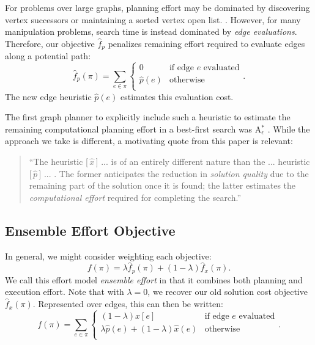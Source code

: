 For problems over large graphs,
planning effort may be dominated by discovering vertex successors
or maintaining a sorted vertex open list.
.
However, for many manipulation problems,
search time is instead dominated by \emph{edge evaluations}.
Therefore, our objective $\hat{f}_p$
penalizes remaining effort required to evaluate edges
along a potential path:
\begin{equation}
   \hat{f}_p(\pi) = \sum_{e \in \pi} \left\{
   \begin{array}{cl}
      0 & \mbox{if edge } e \mbox{ evaluated}  \\
      \hat{p}(e) & \mbox{otherwise} \\
   \end{array}
   \right.
   .
\end{equation}
The new edge heuristic $\hat{p}(e)$ estimates this evaluation cost.

The first graph planner to explicitly include such a heuristic
to estimate the remaining
computational planning effort in a best-first search
was A$_\epsilon^*$ \citep{pearl1982semiadmissible}.
While the approach we take is different,
a motivating quote from this paper is relevant:
\begin{quote}
``The heuristic [\,$\hat{x}$\,] ... is of an entirely
different nature than the ... heuristic [\,$\hat{p}$\,] ... .
The former anticipates the reduction in \emph{solution quality} due to the
remaining part of the solution once it is found;
the latter estimates the \emph{computational effort}
required for completing the search.''
\end{quote}

\subsection{Ensemble Effort Objective}

In general, we might consider weighting each objective:
\begin{equation}
   f(\pi) = \lambda \hat{f}_p(\pi) + (1 - \lambda) \hat{f}_x(\pi) .
   \label{eqn:general-objective}
\end{equation}
We call this effort model
\emph{ensemble effort}
in that it combines both planning and execution effort.
Note that with $\lambda=0$,
we recover our old solution cost objective $\hat{f}_x(\pi)$.
Represented over edges,
this can then be written:
\begin{equation}
   f(\pi) = \sum_{e \in \pi} \left\{
   \begin{array}{cl}
      (1 - \lambda) x[e] & \mbox{if edge } e \mbox{ evaluated}  \\
      \lambda \hat{p}(e) + (1 - \lambda) \hat{x}(e) & \mbox{otherwise} \\
   \end{array}
   \right.
   .
   \label{eqn:general-objective-explicit}
\end{equation}

